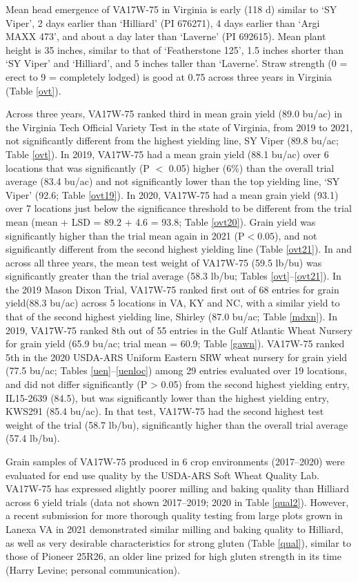 \documentclass[12pt, letterpaper]{article}
\begin{document}
Mean head emergence of VA17W-75 in Virginia is early (118 d) similar to `SY Viper', 2 days earlier than `Hilliard' (PI 676271), 4 days earlier than `Argi MAXX 473', and about a day later than `Laverne' (PI 692615). Mean plant height is 35 inches, similar to that of `Featherstone 125', 1.5 inches shorter than `SY Viper' and `Hilliard', and 5 inches taller than `Laverne'. Straw strength (0 = erect to 9 = completely lodged) is good at 0.75 across three years in Virginia (Table \ref{ovt}). 

Across three years, VA17W-75 ranked third in mean grain yield (89.0 bu/ac) in the Virginia Tech Official Variety Test in the state of Virginia, from 2019 to 2021, not significantly different from the highest yielding line, SY Viper (89.8 bu/ac; Table \ref{ovt}). In 2019, VA17W-75 had a mean grain yield (88.1 bu/ac) over 6 locations that was significantly (P $<$ 0.05) higher (6\%) than the overall trial average (83.4 bu/ac) and not significantly lower than the top yielding line, `SY Viper' (92.6; Table \ref{ovt19}). In 2020, VA17W-75 had a mean grain yield (93.1) over 7 locations just below the significance threshold to be different from the trial mean (mean + LSD = 89.2 + 4.6 = 93.8; Table \ref{ovt20}). Grain yield was significantly higher than the trial mean again in 2021 (P$<0.05$), and not significantly different from the second highest yielding line (Table \ref{ovt21}). In and across all three years, the mean test weight of VA17W-75 (59.5 lb/bu) was significantly greater than the trial average (58.3 lb/bu; Tables \ref{ovt}--\ref{ovt21}). In the 2019 Mason Dixon Trial, VA17W-75 ranked first out of 68 entries for grain yield(88.3 bu/ac) across 5 locations in VA, KY and NC, with a similar yield to that of the second highest yielding line, Shirley (87.0 bu/ac; Table \ref{mdxn}). In 2019, VA17W-75 ranked 8th out of 55 entries in the Gulf Atlantic Wheat Nursery for grain yield (65.9 bu/ac; trial mean = 60.9; Table \ref{gawn}). VA17W-75 ranked 5th in the 2020 USDA-ARS Uniform Eastern SRW wheat nursery for grain yield (77.5 bu/ac; Tables \ref{uen}--\ref{uenloc}) among 29 entries evaluated over 19 locations, and did not differ significantly (P > 0.05) from the second highest yielding entry, IL15-2639 (84.5), but was significantly lower than the highest yielding entry, KWS291 (85.4 bu/ac). In that test, VA17W-75 had the second highest test weight of the trial (58.7 lb/bu), significantly higher than the overall trial average (57.4 lb/bu).  

Grain samples of VA17W-75 produced in 6 crop environments (2017--2020) were evaluated for end use quality by the USDA-ARS Soft Wheat Quality Lab.  VA17W-75 has expressed slightly poorer milling and baking quality than Hilliard across 6 yield trials (data not shown 2017--2019; 2020 in Table \ref{qual2}). However, a recent submission for more thorough quality testing from large plots grown in Lanexa VA in 2021 demonstrated similar milling and baking quality to Hilliard, as well as very desirable characteristics for strong gluten (Table \ref{qual}), similar to those of Pioneer 25R26, an older line prized for high gluten strength in its time (Harry Levine; personal communication).
\end{document}
